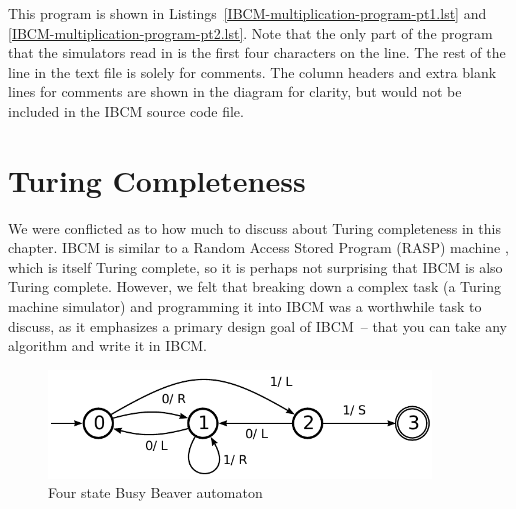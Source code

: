 This program is shown in
Listings~\ref{IBCM-multiplication-program-pt1.lst} and
\ref{IBCM-multiplication-program-pt2.lst}.  Note that the only part of
the program that the simulators read in is the first four characters
on the line.  The rest of the line in the text file is solely for
comments.  The column headers and extra blank lines for comments are
shown in the diagram for clarity, but would not be included in the
IBCM source code file.

\begin{figure}

\end{figure}

\begin{figure}

\end{figure}

\section{Turing Completeness}

We were conflicted as to how much to discuss about Turing completeness
in this chapter.  IBCM is similar to a Random Access Stored Program
(RASP) machine \cite{wikipedia:rasp}, which is itself Turing complete,
so it is perhaps not surprising that IBCM is also Turing complete.
However, we felt that breaking down a complex task (a Turing machine
simulator) and programming it into IBCM was a worthwhile task to
discuss, as it emphasizes a primary design goal of IBCM~-- that
you can take any algorithm and write it in IBCM.

\begin{figure}[h]
\centering
\includegraphics[width=4in]{ibcm/ibcm-automata.pdf}
\caption{Four state Busy Beaver automaton}
\label{BusyBeaverAutomaton}
\end{figure}

